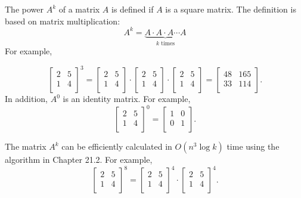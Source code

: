 
The power $A^k$ of a matrix $A$ is defined
if $A$ is a square matrix.
The definition is based on matrix multiplication:
\[ A^k = \underbrace{A \cdot A \cdot A \cdots A}_{\textrm{$k$ times}} \]
For example,

\[
 \begin{bmatrix}
  2 & 5 \\
  1 & 4 \\
 \end{bmatrix}^3 =
 \begin{bmatrix}
  2 & 5 \\
  1 & 4 \\
 \end{bmatrix} \cdot
 \begin{bmatrix}
  2 & 5 \\
  1 & 4 \\
 \end{bmatrix} \cdot
 \begin{bmatrix}
  2 & 5 \\
  1 & 4 \\
 \end{bmatrix} =
 \begin{bmatrix}
  48 & 165 \\
  33 & 114 \\
 \end{bmatrix}.
\]
In addition, $A^0$ is an identity matrix. For example,
\[
 \begin{bmatrix}
  2 & 5 \\
  1 & 4 \\
 \end{bmatrix}^0 =
 \begin{bmatrix}
  1 & 0 \\
  0 & 1 \\
 \end{bmatrix}.
\]

The matrix $A^k$ can be efficiently calculated
in $O(n^3 \log k)$ time using the
algorithm in Chapter 21.2. For example,
\[
 \begin{bmatrix}
  2 & 5 \\
  1 & 4 \\
 \end{bmatrix}^8 =
 \begin{bmatrix}
  2 & 5 \\
  1 & 4 \\
 \end{bmatrix}^4 \cdot
 \begin{bmatrix}
  2 & 5 \\
  1 & 4 \\
 \end{bmatrix}^4.
\]


